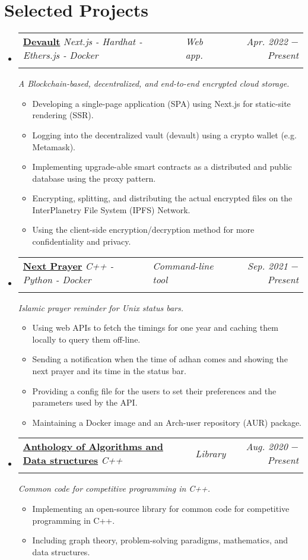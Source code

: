 \documentclass[letterpaper, 11pt]{article}
\makeatletter
\newcommand{\project}[7] {
  \vspace{-1pt}\item
  \begin{tabular*}{0.97\textwidth}[t]{ll@{\extracolsep{\fill}}r}
    #1 \href{#4}{\textbf{\color{RoyalBlue}#2}}
    \textbar{} \textit{\small#5} \textbar{ } & \textit{\footnotesize#7} & \textit{\small #3} \\
    \vspace{-10pt}
  \end{tabular*}
  \textit{\small #6}
  \vspace{-8pt}
}
\newcommand{\subproject}[1] {
\item\small
  {#1}
  \vspace{-2pt}
}
\makeatother
\begin{document}
\section{Selected Projects}
\begin{itemize}[leftmargin=*]
  \project
  {\faIcon{cloud}}
  {Devault}{Apr. 2022 $-$ Present}
  {https://devault.vercel.app/}{Next.js - Hardhat - Ethers.js - Docker}
  {A Blockchain-based, decentralized, and end-to-end encrypted cloud storage.}{Web app.}

  \begin{itemize}
    \subproject
    {Developing a single-page application (SPA) using Next.js for static-site rendering (SSR).}
    \subproject
    {Logging into the decentralized vault (devault) using a crypto wallet (e.g. Metamask).}
    \subproject
    {Implementing upgrade-able smart contracts as a distributed and public database using the proxy pattern.}
    \subproject
    {Encrypting, splitting, and distributing the actual encrypted files on the InterPlanetry File System (IPFS) Network.}
    \subproject
    {Using the client-side encryption/decryption method for more confidentiality and privacy.}
  \end{itemize}\vspace{-4pt}

  \project
  {\faIcon{mosque}}
  {Next Prayer}{Sep. 2021 $-$ Present}
  {https://github.com/AbdeltwabMF/nxprayer}{C++ - Python - Docker}
  {Islamic prayer reminder for Unix status bars.}{Command-line tool}

  \begin{itemize}
    \subproject
    {Using web APIs to fetch the timings for one year and caching them locally to query them off-line.}
    \subproject
    {Sending a notification when the time of adhan comes and showing the next prayer and its time in the status bar.}
    \subproject
    {Providing a config file for the users to set their preferences and the parameters used by the API.}
    \subproject
    {Maintaining a Docker image and an Arch-user repository (AUR) package.}
  \end{itemize}\vspace{-4pt}

  \project
  {\faIcon{laptop-code}}
  {Anthology of Algorithms and Data structures}{Aug. 2020 $-$ Present}
  {https://github.com/AbdeltwabMF/Anthology-of-Algorithms-and-Data-structures}{C++}
  {Common code for competitive programming in C++.}{Library}

  \begin{itemize}
    \subproject
    {Implementing an open-source library for common code for competitive programming in C++.}
    \subproject
    {Including graph theory, problem-solving paradigms, mathematics, and data structures.}
  \end{itemize}\vspace{-4pt}


\end{itemize}
\end{document}

